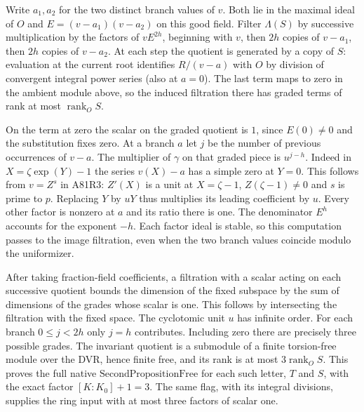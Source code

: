 Write $a_1,a_2$ for the two distinct branch values of $v$.
Both lie in the maximal ideal of $O$ and $E=(v-a_1)(v-a_2)$
on this good field. Filter $\Lambda(S)$ by successive
multiplication by the factors of $v E^{2h}$, beginning with
$v$, then $2h$ copies of $v-a_1$, then $2h$ copies of $v-a_2$.
At each step the quotient is generated by a copy of $S$:
evaluation at the current root identifies $R/(v-a)$ with $O$
by division of convergent integral power series (also at $a=0$).
The last term maps to zero in the ambient module above, so the
induced filtration there has graded terms of rank at most
$\operatorname{rank}_O S$.

On the term at zero the scalar on the graded quotient is $1$,
since $E(0)\ne0$ and the substitution fixes zero. At a branch
$a$ let $j$ be the number of previous occurrences of $v-a$.
The multiplier of $\gamma$ on that graded piece is $u^{j-h}$.
Indeed in $X=\zeta\exp(Y)-1$ the series $v(X)-a$ has a simple
zero at $Y=0$. This follows from $v=Z^s$ in A81R3:
$Z'(X)$ is a unit at $X=\zeta-1$, $Z(\zeta-1)\ne0$ and $s$
is prime to $p$. Replacing $Y$ by $uY$ thus multiplies its leading
coefficient by $u$. Every other factor is nonzero at $a$ and
its ratio there is one. The denominator $E^h$ accounts for
the exponent $-h$. Each factor ideal is stable, so this computation
passes to the image filtration, even when the two branch values
coincide modulo the uniformizer.

After taking fraction-field coefficients, a filtration with a
scalar acting on each successive quotient bounds the dimension
of the fixed subspace by the sum of dimensions of the grades
whose scalar is one. This follows by intersecting the filtration
with the fixed space. The cyclotomic unit $u$ has infinite order.
For each branch $0\le j<2h$ only $j=h$ contributes. Including
zero there are precisely three possible grades. The invariant
quotient is a submodule of a finite torsion-free module over the
DVR, hence finite free, and its rank is at most
$3\operatorname{rank}_O S$. This proves the full native
$\mathrm{SecondPropositionFree}$ for each such letter,
$T$ and $S$, with the exact factor $[K:K_0]+1=3$. The same
flag, with its integral divisions, supplies the ring input with
at most three factors of scalar one.

